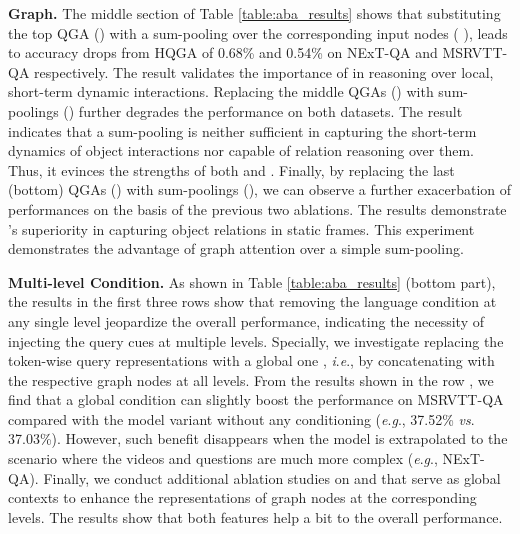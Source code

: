 \documentclass[letterpaper]{article} \usepackage{aaai21}  \usepackage{times}  \usepackage{helvet} \usepackage{courier}  \usepackage[hyphens]{url}  \usepackage{graphicx} \urlstyle{rm} \def\UrlFont{\rm}  \usepackage{natbib}  \usepackage{caption} \usepackage{color, colortbl}
\newcommand{\vs}{\textit{vs}. }
\newcommand{\ie}{\textit{i}.\textit{e}.}
\newcommand{\eg}{\textit{e}.\textit{g}.}
\begin{document}
\textbf{Graph.} The middle section of Table \ref{table:aba_results} shows that substituting the top QGA () with a sum-pooling over the corresponding input nodes ( ), leads to accuracy drops from HQGA of 0.68\% and 0.54\% on NExT-QA and MSRVTT-QA respectively. The result validates the importance of  in reasoning over local, short-term dynamic interactions. Replacing the middle QGAs () with sum-poolings () further degrades the performance on both datasets. 
The result indicates that a sum-pooling is neither sufficient in capturing the short-term dynamics of object interactions nor capable of relation reasoning over them. Thus, it evinces the strengths of both  and . Finally, by replacing the last (bottom) QGAs () with sum-poolings (), we can observe a further exacerbation of performances on the basis of the previous two ablations. The results demonstrate 's superiority in capturing object relations in static frames. This experiment demonstrates the advantage of graph attention over a simple sum-pooling.

\textbf{Multi-level Condition.} 
As shown in Table \ref{table:aba_results} (bottom part), the results in the first three rows show that removing the language condition at any single level jeopardize the overall performance, indicating the necessity of injecting the query cues at multiple levels. Specially, we investigate replacing the token-wise query representations  with a global one , \ie, by concatenating  with the respective graph nodes at all levels. From the results shown in the row , we find that a global condition can slightly boost the performance on MSRVTT-QA compared with the model variant without any conditioning (\eg, 37.52\% \vs 37.03\%). However, such benefit disappears when the model is extrapolated to the scenario where the videos and questions are much more complex (\eg, NExT-QA). Finally, we conduct additional ablation studies on  and  that serve as global contexts to enhance the representations of graph nodes at the corresponding levels. The results show that both features help a bit to the overall performance.
\end{document}
